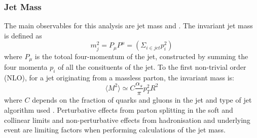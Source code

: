 \subsubsection{Jet Mass}
The main observables for this analysis are jet mass and \pt. The invariant jet mass is defined as
\begin{equation}
m_{j}^2 = P_\mu P^\mu  = \left(\Sigma_{i\in jet}p_i^2\right)
\end{equation}
where $P_\mu$ is the totoal four-momentum of the jet, constructed by summing the four momenta $p_i$ of all the consituents of the jet. To the first non-trivial order (NLO), for a jet originating from a massless parton, the invariant mass is:
\begin{equation}
\langle M^2\rangle  \simeq C\frac{\alpha_s}{\pi}p_T^2R^2
\end{equation}
where $C$ depends on the fraction of quarks and gluons in the jet and type of jet algorithm used \cite{jetography}. Perturbative effects from parton splitting in the soft and collinear limits and non-perturbative effects from hadronisation and underlying event are limiting factors when performing calculations of the jet mass.
